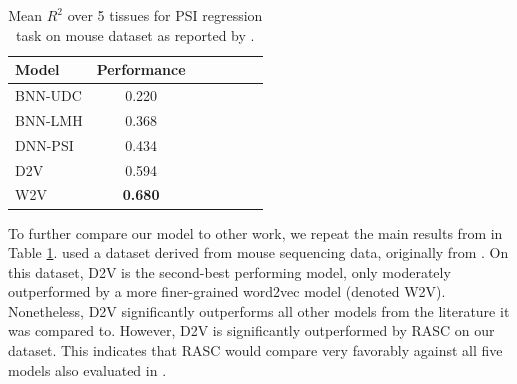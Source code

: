 \begin{table}
	\centering
	\begin{tabular}{ l c c c c c c} 
		\hline
		Model & Performance \\
		\hline
		BNN-UDC \cite{jha} & 0.220\\
		BNN-LMH \cite{jha}& 0.368\\
		DNN-PSI \cite{jha} & 0.434\\
		D2V \cite{d2vsplicing} & 0.594\\
		W2V \cite{d2vsplicing} & \textbf{0.680}\\
		\hline
	\end{tabular}
	\caption{Mean $R^2$ over 5 tissues for PSI regression task on mouse dataset as reported by \cite{d2vsplicing}. 
	}
	\label{table:ieee_regression}
\end{table}

To further compare our model to other work, we repeat the main results from \cite{d2vsplicing} in Table \ref{table:ieee_regression}. \cite{d2vsplicing} used a dataset derived from mouse sequencing data, originally from \cite{jha}. On this dataset, D2V is the second-best performing model, only moderately outperformed by a more finer-grained word2vec model (denoted W2V). Nonetheless, D2V significantly outperforms all other models from the literature it was compared to. 
However, D2V is significantly outperformed by RASC on our dataset. This indicates that RASC would compare very favorably against all five models also evaluated in \cite{d2vsplicing}. 



